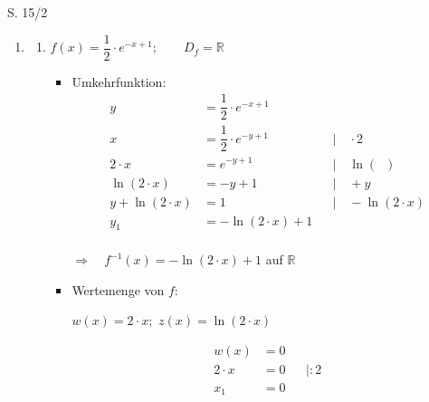 \begin{Exercise}{S. 15/2}{}
    \begin{enumerate}
        \item [2.]\begin{enumerate}[label=\alph*)]
            \item[f)] {
                $f(x) = \dfrac{1}{2} \cdot e^{-x +1}; \qquad D_{f} = \mathbb{R}$\\
                \begin{itemize}[leftmargin=*]
                    \item Umkehrfunktion: \\{
                        \vspace{-2.0ex}
                        \begin{align*}
                            y &= \dfrac{1}{2} \cdot e^{-x +1} && \\[2.0ex]
                            x &= \dfrac{1}{2} \cdot e^{-y +1} &&| \quad \cdot 2\\[1.5ex]
                            2 \cdot x &= e^{-y +1} &&| \quad \ln(\phantom{x})\\[1.5ex]
                            \ln(2 \cdot x) &= -y +1 &&| \quad + y\\[1.5ex]
                            y + \ln(2 \cdot x) &= 1 &&| \quad - \ln(2 \cdot x)\\[1.5ex]
                            y_{1} &= - \ln(2 \cdot x) + 1&&
                        \end{align*}\\
                        $\Rightarrow \quad f^{-1}(x) =- \ln(2 \cdot x) + 1$ \quad auf \quad $\mathbb{R}$\\
                        }
                    \item Wertemenge von $f$: \\[2.0ex]{
                        $w(x) = 2 \cdot x;$ \qquad $z(x) = \ln(2 \cdot x)$\\[-2.0ex]
                        \begin{minipage}[t]{0.20\linewidth}
                            \begin{align*}
                                w(x) &= 0 \\[2.0ex]
                                2 \cdot x &= 0 &&| :2\\[1.0ex]
                                x_{1} &= 0 &&\\
                            \end{align*} 
                        \end{minipage}
}
\end{itemize}}
\end{enumerate}
\end{enumerate}
\end{Exercise}
